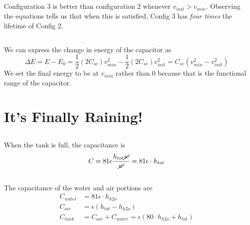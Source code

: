 \documentclass[]{article}
\begin{document}
\subsection{}

Configuration 3 is better than configuration 2 whenever \(v_{init} > v_{min}\). 
Observing the equations tells us that when this is satisfied, Config 3 has \emph{four times} the lifetime of Config 2. 

\subsection{}

We can express the change in energy of the capacitor as 
\begin{equation}
	\Delta E = E - E_0 = \frac{1}{2} (2C_{sc}) v_{min}^2 - \frac{1}{2} (2C_{sc}) v_{init}^2 = C_{sc} (v_{min}^2 - v_{init}^2)
\end{equation}
We set the final energy to be at \(v_{min}\) rather than \(0\) because that is the functional range of the capacitor. 

\section{It's Finally Raining!}

\subsection{}

When the tank is full, the capacitance is 
\begin{equation}
	C = 81 \epsilon \frac{h_{tot} \cancel{w}}{\cancel{w}} = 81 \epsilon \cdot h_{tot}
\end{equation}

\subsection{}

The capacitance of the water and air portions are
\begin{align}
	C_{water} &= 81 \epsilon \cdot h_{h2o} \\
	C_{air} &= \epsilon (h_{tot} - h_{h2o}) \\
	C_{tank} &= C_{air} + C_{water} = \epsilon (80 \cdot h_{h2o} + h_{tot})
\end{align}

\subsection{}
\end{document}

